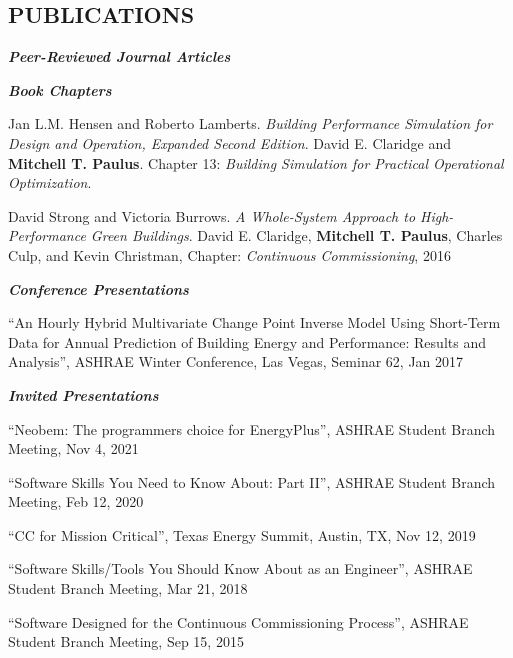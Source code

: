 \documentclass[margin]{res} %
\begin{document}
\begin{resume}
\section{PUBLICATIONS}
{\sl \textbf{Peer-Reviewed Journal Articles}}









{\sl \textbf{Book Chapters}}

Jan L.M. Hensen and Roberto Lamberts. \textit{Building Performance Simulation
for Design and Operation, Expanded Second Edition}. David E. Claridge
and \textbf{Mitchell T. Paulus}. Chapter 13: \textit{Building Simulation
for Practical Operational Optimization}.

David Strong and Victoria Burrows. \textit{A Whole-System Approach to High-Performance Green Buildings}. David E. Claridge, \textbf{Mitchell T. Paulus}, Charles Culp, and Kevin Christman, Chapter: \textit{Continuous Commissioning\textsuperscript{\textregistered{}}}, 2016

\textbf{\textit{Conference Presentations}}

``An Hourly Hybrid Multivariate Change Point Inverse  Model Using Short-Term Data for Annual Prediction of Building Energy and Performance: Results and Analysis'', ASHRAE Winter Conference, Las Vegas, Seminar 62, Jan 2017

\textbf{\textit{Invited Presentations}}

``Neobem: The programmers choice for EnergyPlus'', ASHRAE Student Branch Meeting, Nov 4, 2021

``Software Skills You Need to Know About: Part II'', ASHRAE Student Branch Meeting, Feb 12, 2020

``CC\textsuperscript{\textregistered{}} for Mission Critical'', Texas Energy Summit, Austin, TX, Nov 12, 2019

``Software Skills/Tools You Should Know About as an Engineer'', ASHRAE Student Branch Meeting, Mar 21, 2018

``Software Designed for the Continuous Commissioning Process'', ASHRAE Student Branch Meeting, Sep 15, 2015


\end{resume}
\end{document}
